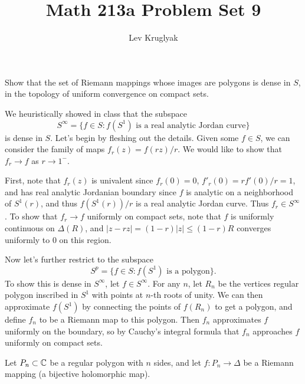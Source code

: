 \documentclass{pset}
\title{Math 213a Problem Set 9}
\author{Lev Kruglyak}
\begin{document}
\maketitle
\collaborators

\begin{problem}{4.19}
  Show that the set of Riemann mappings whose images are polygons is dense in $S$, in the topology of uniform convergence on compact sets.
\end{problem}

\begin{solution}
  We heuristically showed in class that the subspace 
  \[
    S^\infty = \{ f\in S : f(S^1)\textrm{ is a real analytic Jordan curve}\}
  \]
  is dense in $S$. Let's begin by fleshing out the details. Given some $f\in S$, we can consider the family of maps $f_r(z) = f(rz)/r$. We would like to show that $f_r \to f$ as $r\to 1^-$.

  First, note that $f_r(z)$ is univalent since $f_r(0)=0$, $f'_r(0)=rf'(0)/r=1$, and has real analytic Jordanian boundary since $f$ is analytic on a neighborhood of $S^1(r)$, and thus $f(S^1(r))/r$ is a real analytic Jordan curve. Thus $f_r\in S^\infty$. To show that $f_r \to f$ uniformly on compact sets, note that $f$ is uniformly continuous on $\Delta(R)$, and $|z-rz|=(1-r)|z|\leq (1-r)R$ converges uniformly to $0$ on this region.

  Now let's further restrict to the subspace
  \[
    S^p = \{ f \in S : f(S^1)\textrm{ is a polygon}\}.
  \]
  To show this is dense in $S^\infty$, let $f\in S^\infty$. For any $n$, let $R_n$ be the vertices regular polygon inscribed in $S^1$ with points at $n$-th roots of unity. We can then approximate $f(S^1)$ by connecting the points of $f(R_n)$ to get a polygon, and define $f_n$ to be a Riemann map to this polygon. Then $f_n$ approximates $f$ uniformly on the boundary, so by Cauchy's integral formula that $f_n$ approaches $f$ uniformly on compact sets.
\end{solution}

\begin{problem}{4.27}
  Let $P_n\subset \mathbb{C}$ be a regular polygon with $n$ sides, and let $f : P_n \to \Delta$ be a Riemann mapping (a bijective holomorphic map).
\end{problem}
\end{document}
